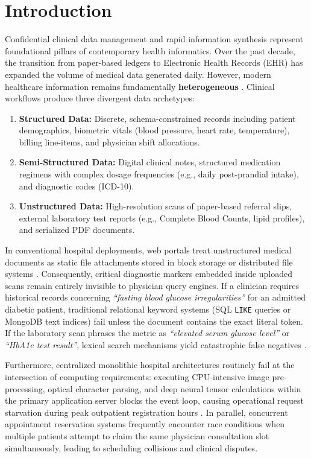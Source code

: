 \documentclass[conference]{IEEEtran}
\begin{document}
\section{Introduction}
Confidential clinical data management and rapid information synthesis represent foundational pillars of contemporary health informatics. Over the past decade, the transition from paper-based ledgers to Electronic Health Records (EHR) has expanded the volume of medical data generated daily. However, modern healthcare information remains fundamentally \textbf{heterogeneous} \cite{jensen2012mining}. Clinical workflows produce three divergent data archetypes:
\begin{enumerate}
    \item \textbf{Structured Data:} Discrete, schema-constrained records including patient demographics, biometric vitals (blood pressure, heart rate, temperature), billing line-items, and physician shift allocations.
    \item \textbf{Semi-Structured Data:} Digital clinical notes, structured medication regimens with complex dosage frequencies (e.g., daily post-prandial intake), and diagnostic codes (ICD-10).
    \item \textbf{Unstructured Data:} High-resolution scans of paper-based referral slips, external laboratory test reports (e.g., Complete Blood Counts, lipid profiles), and serialized PDF documents.
\end{enumerate}

In conventional hospital deployments, web portals treat unstructured medical documents as static file attachments stored in block storage or distributed file systems \cite{rajkomar2018scalable}. Consequently, critical diagnostic markers embedded inside uploaded scans remain entirely invisible to physician query engines. If a clinician requires historical records concerning \textit{``fasting blood glucose irregularities''} for an admitted diabetic patient, traditional relational keyword systems (SQL \texttt{LIKE} queries or MongoDB text indices) fail unless the document contains the exact literal token. If the laboratory scan phrases the metric as \textit{``elevated serum glucose level''} or \textit{``HbA1c test result''}, lexical search mechanisms yield catastrophic false negatives \cite{choi2016retain}.

Furthermore, centralized monolithic hospital architectures routinely fail at the intersection of computing requirements: executing CPU-intensive image pre-processing, optical character parsing, and deep neural tensor calculations within the primary application server blocks the event loop, causing operational request starvation during peak outpatient registration hours \cite{fowler2014microservices}. In parallel, concurrent appointment reservation systems frequently encounter race conditions when multiple patients attempt to claim the same physician consultation slot simultaneously, leading to scheduling collisions and clinical disputes.
\end{document}
